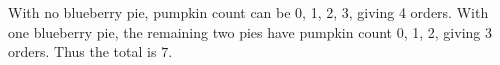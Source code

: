 With no blueberry pie, pumpkin count can be 0, 1, 2, 3, giving 4 orders. With one blueberry pie, the remaining two pies have pumpkin count 0, 1, 2, giving 3 orders. Thus the total is $\boxed7 $.
